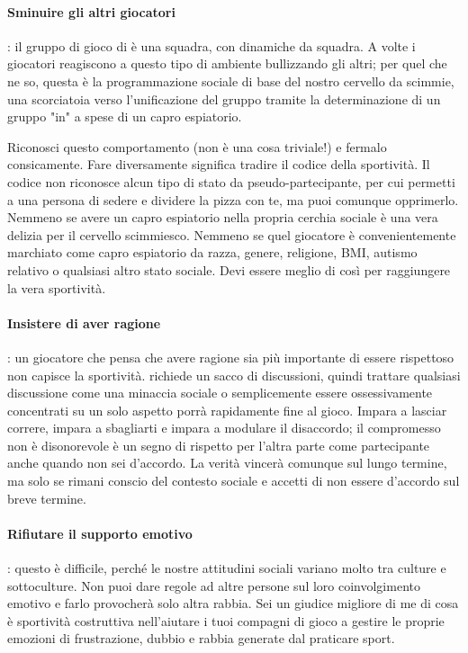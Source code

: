 \paragraph{Sminuire gli altri giocatori}: il gruppo di gioco di \dnd{} è una squadra, con dinamiche da squadra. A volte i giocatori reagiscono a questo tipo di ambiente bullizzando gli altri; per quel che ne so, questa è la programmazione sociale di base del nostro cervello da scimmie, una scorciatoia verso l'unificazione del gruppo tramite la determinazione di un gruppo "in" a spese di un capro espiatorio.

Riconosci questo comportamento (non è una cosa triviale!) e fermalo consicamente. Fare diversamente significa tradire il codice della sportività. Il codice non riconosce alcun tipo di stato da pseudo-partecipante, per cui permetti a una persona di sedere e dividere la pizza con te, ma puoi comunque opprimerlo. Nemmeno se avere un capro espiatorio nella propria cerchia sociale è una vera delizia per il cervello scimmiesco. Nemmeno se quel giocatore è convenientemente marchiato come capro espiatorio da razza, genere, religione, BMI, autismo relativo o qualsiasi altro stato sociale. Devi essere meglio di così per raggiungere la vera sportività.

\paragraph{Insistere di aver ragione}: un giocatore che pensa che avere ragione sia più importante di essere rispettoso non capisce la sportività. \dnd{} richiede un sacco di discussioni, quindi trattare qualsiasi discussione come una minaccia sociale o semplicemente essere ossessivamente concentrati su un solo aspetto porrà rapidamente fine al gioco. Impara a lasciar correre, impara a sbagliarti e impara a modulare il disaccordo; il compromesso non è disonorevole è un segno di rispetto per l'altra parte come partecipante anche quando non sei d'accordo. La verità vincerà comunque sul lungo termine, ma solo se rimani conscio del contesto sociale e accetti di non essere d'accordo sul breve termine.

\paragraph{Rifiutare il supporto emotivo}: questo è difficile, perché le nostre attitudini sociali variano molto tra culture e sottoculture. Non puoi dare regole ad altre persone sul loro coinvolgimento emotivo e farlo provocherà solo altra rabbia. Sei un giudice migliore di me di cosa è sportività costruttiva nell'aiutare i tuoi compagni di gioco a gestire le proprie emozioni di frustrazione, dubbio e rabbia generate dal praticare sport.

